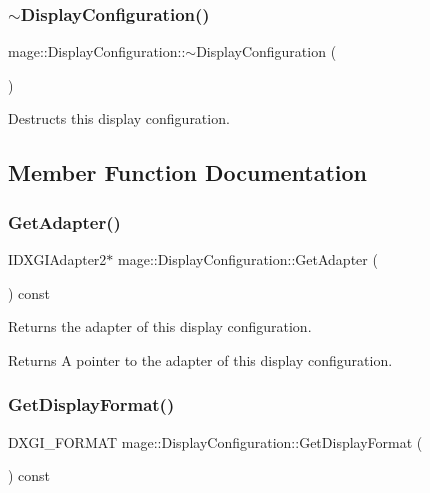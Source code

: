 \subsubsection{\texorpdfstring{$\sim$\+Display\+Configuration()}{~DisplayConfiguration()}}
{\footnotesize\ttfamily mage\+::\+Display\+Configuration\+::$\sim$\+Display\+Configuration (\begin{DoxyParamCaption}{ }\end{DoxyParamCaption})\hspace{0.3cm}{\ttfamily [default]}}

Destructs this display configuration. 

\subsection{Member Function Documentation}
\hypertarget{structmage_1_1_display_configuration_a415acc2cba9d5f28dc42073bb69fbac2}{}\label{structmage_1_1_display_configuration_a415acc2cba9d5f28dc42073bb69fbac2} 
\subsubsection{\texorpdfstring{Get\+Adapter()}{GetAdapter()}}
{\footnotesize\ttfamily I\+D\+X\+G\+I\+Adapter2$\ast$ mage\+::\+Display\+Configuration\+::\+Get\+Adapter (\begin{DoxyParamCaption}{ }\end{DoxyParamCaption}) const\hspace{0.3cm}{\ttfamily [noexcept]}}

Returns the adapter of this display configuration.

\begin{DoxyReturn}{Returns}
A pointer to the adapter of this display configuration. 
\end{DoxyReturn}
\hypertarget{structmage_1_1_display_configuration_a412215b18edac3ec6bf18cd00d8c689b}{}\label{structmage_1_1_display_configuration_a412215b18edac3ec6bf18cd00d8c689b} 
\subsubsection{\texorpdfstring{Get\+Display\+Format()}{GetDisplayFormat()}}
{\footnotesize\ttfamily D\+X\+G\+I\+\_\+\+F\+O\+R\+M\+AT mage\+::\+Display\+Configuration\+::\+Get\+Display\+Format (\begin{DoxyParamCaption}{ }\end{DoxyParamCaption}) const\hspace{0.3cm}{\ttfamily [noexcept]}}


